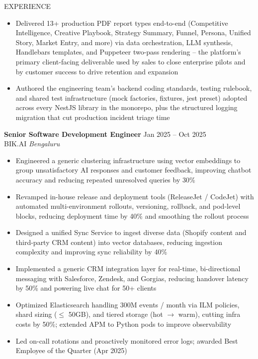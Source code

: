 \documentclass{resume}
\begin{document}
\begin{rSection}{EXPERIENCE}
\begin{itemize}
    \item Delivered 13+ production PDF report types end-to-end (Competitive Intelligence, Creative Playbook, Strategy Summary, Funnel, Persona, Unified Story, Market Entry, and more) via data orchestration, LLM synthesis, Handlebars templates, and Puppeteer two-pass rendering -- the platform's primary client-facing deliverable used by sales to close enterprise pilots and by customer success to drive retention and expansion
    \item Authored the engineering team's backend coding standards, testing rulebook, and shared test infrastructure (mock factories, fixtures, jest preset) adopted across every NestJS library in the monorepo, plus the structured logging migration that cut production incident triage time
\end{itemize}

\textbf{Senior Software Development Engineer} \hfill Jan 2025 -- Oct 2025 \\
BIK.AI \hfill \textit{Bengaluru}
\begin{itemize}\itemsep -3pt
    \item Engineered a generic clustering infrastructure using vector embeddings to group unsatisfactory AI responses and customer feedback, improving chatbot accuracy and reducing repeated unresolved queries by 30\%
    \item Revamped in-house release and deployment tools (ReleaseJet / CodeJet) with automated multi-environment rollouts, versioning, rollback, and pod-level blocks, reducing deployment time by 40\% and smoothing the rollout process
    \item Designed a unified Sync Service to ingest diverse data (Shopify content and third-party CRM content) into vector databases, reducing ingestion complexity and improving sync reliability by 40\%
    \item Implemented a generic CRM integration layer for real-time, bi-directional messaging with Salesforce, Zendesk, and Gorgias, reducing handover latency by 50\% and powering live chat for 50+ clients
    \item Optimized Elasticsearch handling 300M events / month via ILM policies, shard sizing ($\leq$ 50GB), and tiered storage (hot $\rightarrow$ warm), cutting infra costs by 50\%; extended APM to Python pods to improve observability
    \item Led on-call rotations and proactively monitored error logs; awarded Best Employee of the Quarter (Apr 2025)
\end{itemize}


\end{rSection}
\end{document}
